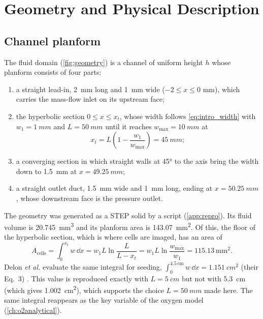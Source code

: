\chapter{Geometry and Physical Description}
\label{ch:geometry}

\section{Channel planform}

The fluid domain (\cref{fig:geometry}) is a channel of uniform height $h$ whose planform consists of four parts:
\begin{enumerate}
\item a straight lead-in, \SI{2}{mm} long and \SI{1}{mm} wide ($-2\le x\le0$ mm), which carries the mass-flow inlet on its upstream face;
\item the hyperbolic section $0\le x\le x_t$, whose width follows \cref{eq:intro_width} with $w_1=\SI{1}{mm}$ and $L=\SI{50}{mm}$ until it reaches $w_{\max}=\SI{10}{mm}$ at
\begin{equation}
x_t=L\left(1-\frac{w_1}{w_{\max}}\right)=\SI{45}{mm};
\label{eq:geo_xt}
\end{equation}
\item a converging section in which straight walls at \ang{45} to the axis bring the width down to \SI{1.5}{mm} at $x=\SI{49.25}{mm}$;
\item a straight outlet duct, \SI{1.5}{mm} wide and \SI{1}{mm} long, ending at $x=\SI{50.25}{mm}$, whose downstream face is the pressure outlet.
\end{enumerate}
The geometry was generated as a STEP solid by a script (\cref{app:repro}). Its fluid volume is \SI{20.745}{\milli\metre\cubed} and its planform area is \SI{143.07}{\milli\metre\squared}. Of this, the floor of the hyperbolic section, which is where cells are imaged, has an area of
\begin{equation}
A_{\mathrm{cells}}=\int_0^{x_t}w\,\dd x=w_1L\ln\frac{L}{L-x_t}=w_1L\ln\frac{w_{\max}}{w_1}=\SI{115.13}{\milli\metre\squared}.
\label{eq:geo_area}
\end{equation}
Delon \emph{et al.} evaluate the same integral for seeding, $\int_0^{4.5\,\mathrm{cm}}w\,\dd x=\SI{1.151}{cm^2}$ (their Eq.~3) \tagP. This value is reproduced exactly with $L=\SI{5}{cm}$ but not with \SI{5.3}{cm} (which gives \SI{1.002}{cm^2}), which supports the choice $L=\SI{50}{mm}$ made here. The same integral reappears as the key variable of the oxygen model (\cref{ch:o2analytical}).

